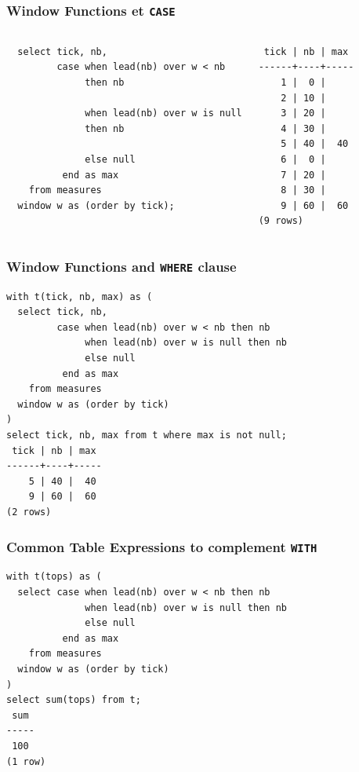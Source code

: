 \documentclass{beamer}
\begin{document}
\begin{frame}[fragile]
  \frametitle{Window Functions et \texttt{CASE}}

\begin{columns}
\begin{verbatim}
  select tick, nb,
         case when lead(nb) over w < nb
              then nb

              when lead(nb) over w is null
              then nb

              else null
          end as max
    from measures
  window w as (order by tick);
\end{verbatim}
\begin{verbatim}
 tick | nb | max 
------+----+-----
    1 |  0 |    
    2 | 10 |    
    3 | 20 |    
    4 | 30 |    
    5 | 40 |  40
    6 |  0 |    
    7 | 20 |    
    8 | 30 |    
    9 | 60 |  60
(9 rows)
\end{verbatim}
\end{columns}
\end{frame}

\begin{frame}[fragile]
  \frametitle{Window Functions and \texttt{WHERE} clause}

\begin{verbatim}
with t(tick, nb, max) as (
  select tick, nb,
         case when lead(nb) over w < nb then nb
              when lead(nb) over w is null then nb
              else null
          end as max
    from measures
  window w as (order by tick)
)
select tick, nb, max from t where max is not null;
 tick | nb | max 
------+----+-----
    5 | 40 |  40
    9 | 60 |  60
(2 rows)
\end{verbatim}
\end{frame}

\begin{frame}[fragile]
  \frametitle{Common Table Expressions to complement \texttt{WITH}}

\begin{verbatim}
with t(tops) as (
  select case when lead(nb) over w < nb then nb
              when lead(nb) over w is null then nb
              else null
          end as max
    from measures
  window w as (order by tick)
)
select sum(tops) from t;
 sum 
-----
 100
(1 row)
\end{verbatim}
\end{frame}
\end{document}
